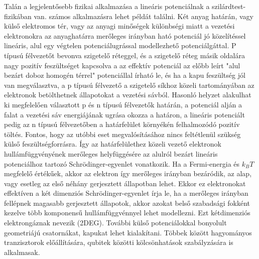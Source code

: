 Talán a legjelentősebb fizikai alkalmazása a lineáris potenciálnak a szilárdtest-fizikában van. \cite{Beenakker_1991} számos alkalmazásra lehet példát találni. Két anyag határán, vagy külső elektromos tér, vagy az anyagi minőségek különbségi miatt a vezetési elektronokra az anyaghatárra merőleges irányban ható potenciál jó közelítéssel lineáris, alul egy végtelen potenciálugrással modellezhető potenciálgáttal. P típusú félvezetőt bevonva szigetelő réteggel, és a szigetelő réteg másik oldalára nagy pozitív feszültséget kapcsolva a az effektív potenciál az előbb leírt "alul bezárt doboz homogén térrel" potenciállal írható le, és ha a kapu feszültség jól van megválasztva, a p típusú félvezető a szigetelő síkhoz közeli tartományában az elektronok betölthetnek állapotokat a vezetési sávból. Hasonló helyzet alakulhat ki megfelelően választott p és n típusú félvezetők határán, a potenciál alján a falat a vezetési sáv energiájának ugrása okozza a határon, a lineáris potenciált pedig az n típusú félvezetőben a határfelület környékén felhalmozódó pozitív töltés. Fontos, hogy az utóbbi eset megvalósításához nincs feltétlenül szükség külső feszültségforrásra. Így az határfelülethez közeli vezető elektronok hullámfüggvényének merőleges helyfüggésére az alulról bezárt lineáris potenciálhoz tartozó Schrödinger-egyenlet vonatkozik. Ha a Fermi-energia és $k_BT$ megfelelő értékűek, akkor az elektron így merőleges irányban bezáródik, az alap, vagy esetleg az első néhány gerjesztett állapotban lehet. Ekkor ez elektronokat effektíven a két dimenziós Schrödinger-egyenlet írja le, ha a merőleges irányban fellépnek magasabb gerjesztett állapotok, akkor azokat belső szabadsági fokként kezelve több komponensű hullámfüggvénnyel lehet modellezni. Ezt kétdimenziós elektrongáznak nevezik (2DEG). További külső potenciálokkal bonyolult geometriájú csatornákat, kapukat lehet kialakítani. Többek között hagyományos tranzisztorok előállítására, qubitek közötti kölcsönhatások szabályzására is alkalmasak.


